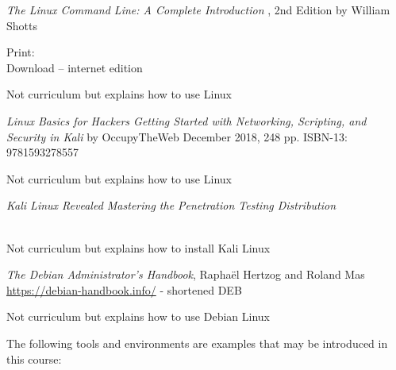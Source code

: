\documentclass[Screen16to9,17pt]{foils}
\begin{document}


\emph{The Linux Command Line: A Complete Introduction }, 2nd Edition
by William Shotts

Print: \\
Download -- internet edition 


Not curriculum but explains how to use Linux



\emph{Linux Basics for Hackers
Getting Started with Networking, Scripting, and Security in Kali}
by OccupyTheWeb
December 2018, 248 pp.
ISBN-13:
9781593278557

Not curriculum but explains how to use Linux



\emph{Kali Linux Revealed  Mastering the Penetration Testing Distribution}

\\
Not curriculum but explains how to install Kali Linux




\emph{The Debian Administrator’s Handbook}, Raphaël Hertzog and Roland Mas\\
\url{https://debian-handbook.info/} - shortened DEB

Not curriculum but explains how to use Debian Linux






The following tools and environments are examples that may be introduced in this course:
\end{document}
